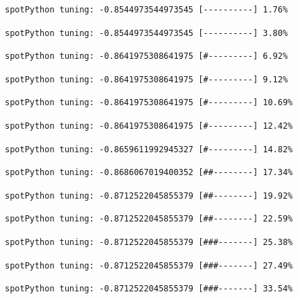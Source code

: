 \documentclass[
  letterpaper,
  DIV=11,
  numbers=noendperiod]{scrreprt}
\begin{document}
\begin{verbatim}
spotPython tuning: -0.8544973544973545 [----------] 1.76% 
\end{verbatim}

\begin{verbatim}
spotPython tuning: -0.8544973544973545 [----------] 3.80% 
\end{verbatim}

\begin{verbatim}
spotPython tuning: -0.8641975308641975 [#---------] 6.92% 
\end{verbatim}

\begin{verbatim}
spotPython tuning: -0.8641975308641975 [#---------] 9.12% 
\end{verbatim}

\begin{verbatim}
spotPython tuning: -0.8641975308641975 [#---------] 10.69% 
\end{verbatim}

\begin{verbatim}
spotPython tuning: -0.8641975308641975 [#---------] 12.42% 
\end{verbatim}

\begin{verbatim}
spotPython tuning: -0.8659611992945327 [#---------] 14.82% 
\end{verbatim}

\begin{verbatim}
spotPython tuning: -0.8686067019400352 [##--------] 17.34% 
\end{verbatim}

\begin{verbatim}
spotPython tuning: -0.8712522045855379 [##--------] 19.92% 
\end{verbatim}

\begin{verbatim}
spotPython tuning: -0.8712522045855379 [##--------] 22.59% 
\end{verbatim}

\begin{verbatim}
spotPython tuning: -0.8712522045855379 [###-------] 25.38% 
\end{verbatim}

\begin{verbatim}
spotPython tuning: -0.8712522045855379 [###-------] 27.49% 
\end{verbatim}

\begin{verbatim}
spotPython tuning: -0.8712522045855379 [###-------] 33.54% 
\end{verbatim}
\end{document}
